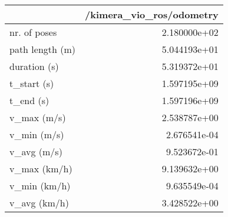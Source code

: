 \begin{tabular}{lr}
\toprule
{} &  /kimera\_vio\_ros/odometry \\
\midrule
nr. of poses    &              2.180000e+02 \\
path length (m) &              5.044193e+01 \\
duration (s)    &              5.319372e+01 \\
t\_start (s)     &              1.597195e+09 \\
t\_end (s)       &              1.597196e+09 \\
v\_max (m/s)     &              2.538787e+00 \\
v\_min (m/s)     &              2.676541e-04 \\
v\_avg (m/s)     &              9.523672e-01 \\
v\_max (km/h)    &              9.139632e+00 \\
v\_min (km/h)    &              9.635549e-04 \\
v\_avg (km/h)    &              3.428522e+00 \\
\bottomrule
\end{tabular}
